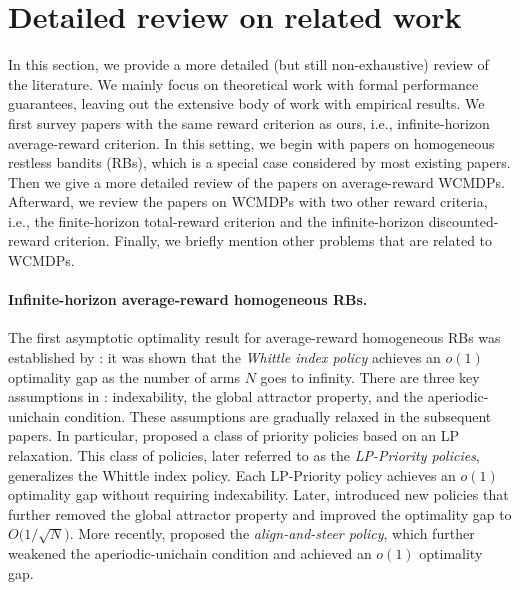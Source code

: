 \section{Detailed review on related work}
\label{app:additional-related-work}
In this section, we provide a more detailed (but still non-exhaustive) review of the literature. 
We mainly focus on theoretical work with formal performance guarantees, leaving out the extensive body of work with empirical results.
We first survey papers with the same reward criterion as ours, i.e., infinite-horizon average-reward criterion. 
In this setting, we begin with papers on homogeneous restless bandits (RBs), which is a special case considered by most existing papers. 
Then we give a more detailed review of the papers on average-reward WCMDPs. 
Afterward, we review the papers on WCMDPs with two other reward criteria, i.e., the finite-horizon total-reward criterion and the infinite-horizon discounted-reward criterion. 
Finally, we briefly mention other problems that are related to WCMDPs. 


\paragraph{Infinite-horizon average-reward homogeneous RBs.}
The first asymptotic optimality result for average-reward homogeneous RBs was established by \citet{WebWei_90}: it was shown that the \emph{Whittle index policy} \citep{Whi_88_rb} achieves an $o(1)$ optimality gap as the number of arms $N$ goes to infinity. There are three key assumptions in \citep{WebWei_90}: indexability, the global attractor property, and the aperiodic-unichain condition. 
These assumptions are gradually relaxed in the subsequent papers. In particular, \cite{Ver_16_verloop} proposed a class of priority policies based on an LP relaxation. This class of policies, later referred to as the \emph{LP-Priority policies}, generalizes the Whittle index policy. Each LP-Priority policy achieves an $o(1)$ optimality gap without requiring indexability. 
Later, \citet{HonXieChe_23,HonXieChe_24} introduced new policies that further removed the global attractor property and improved the optimality gap to $O\bigl(1/\sqrt{N}\bigr)$. 
More recently, \citet{Yan_24} proposed the \emph{align-and-steer policy}, which further weakened the aperiodic-unichain condition and achieved an $o(1)$ optimality gap. 


